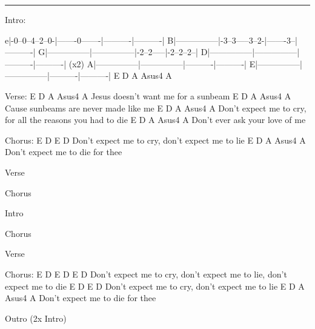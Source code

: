 \noindent\rule{\columnwidth}{1pt}

\begin{lsttab}
Intro:

e|-0--0--4--2--0-|-------0-------|----------|----------|
B|---------------|-3--3-----3--2-|-------3--|----------|
G|---------------|---------------|-2--2-----|-2--2--2--|
D|---------------|---------------|----------|----------|   (x2)
A|---------------|---------------|----------|----------|
E|---------------|---------------|----------|----------|
   E               D               A   Asus4  A 
\end{lsttab}
\begin{lstsong}
Verse:
E             D             A      Asus4 A
Jesus doesn't want me for a sunbeam
      E            D               A    Asus4 A
Cause sunbeams are never made like me
E                  D                A           Asus4  A 
Don't expect me to cry, for all the reasons you had to die
E          D                A   Asus4 A
Don't ever ask your love of me 

Chorus:
E                  D    E                  D
Don't expect me to cry, don't expect me to lie
E                  D       A    Asus4 A
Don't expect me to die for thee

Verse

Chorus

Intro

Chorus

Verse

Chorus:
E                  D    E                  D    E                  D
Don't expect me to cry, don't expect me to lie, don't expect me to die
E                  D    E                  D
Don't expect me to cry, don't expect me to lie
E                  D       A    Asus4 A
Don't expect me to die for thee

Outro (2x Intro)
\end{lstsong}
\newpage

